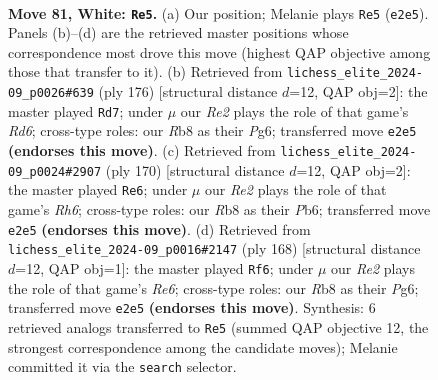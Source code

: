 \documentclass[11pt]{article}
\begin{document}
\clearpage

\begin{figure}[p]\centering
\begin{subfigure}{0.46\textwidth}\centering
\resizebox{\linewidth}{!}{%
\newchessgame
\chessboard[
  setfen={1R6/3k2r1/8/3b4/1P6/2K5/4R3/8 w - - 35 81},
  showmover=false,
  pgfstyle=straightmove, color=movearrow, markmove={e2-e5}
]}
\caption{}
\end{subfigure}\hfill
\begin{subfigure}{0.46\textwidth}\centering
\resizebox{\linewidth}{!}{%
\newchessgame
\chessboard[
  setfen={4r2k/8/3R2PK/8/8/8/8/8 w - - 29 89},
  showmover=false,
  pgfstyle=straightmove, color=movearrow, markmove={d6-d7}
]}
\caption{}
\end{subfigure}
\\[4pt]
\begin{subfigure}{0.46\textwidth}\centering
\resizebox{\linewidth}{!}{%
\newchessgame
\chessboard[
  setfen={k2r4/8/KP5R/8/8/8/8/8 w - - 37 86},
  showmover=false,
  pgfstyle=straightmove, color=movearrow, markmove={h6-e6}
]}
\caption{}
\end{subfigure}\hfill
\begin{subfigure}{0.46\textwidth}\centering
\resizebox{\linewidth}{!}{%
\newchessgame
\chessboard[
  setfen={r6k/8/4R1PK/8/8/8/8/8 w - - 17 85},
  showmover=false,
  pgfstyle=straightmove, color=movearrow, markmove={e6-f6}
]}
\caption{}
\end{subfigure}
\caption{\textbf{Move 81, White: \texttt{Re5}.} (a) Our position; Melanie plays \texttt{Re5} (\texttt{e2e5}). Panels (b)--(d) are the retrieved master positions whose correspondence most drove this move (highest QAP objective among those that transfer to it). (b) Retrieved from \texttt{lichess\_elite\_2024-09\_p0026\#639} (ply 176) [structural distance $d$=12, QAP obj=2]: the master played \texttt{Rd7}; under $\mu$ our \emph{Re2} plays the role of that game's \emph{Rd6}; cross-type roles: our \emph{R}b8 as their \emph{P}g6; transferred move \texttt{e2e5} \textbf{(endorses this move)}. (c) Retrieved from \texttt{lichess\_elite\_2024-09\_p0024\#2907} (ply 170) [structural distance $d$=12, QAP obj=2]: the master played \texttt{Re6}; under $\mu$ our \emph{Re2} plays the role of that game's \emph{Rh6}; cross-type roles: our \emph{R}b8 as their \emph{P}b6; transferred move \texttt{e2e5} \textbf{(endorses this move)}. (d) Retrieved from \texttt{lichess\_elite\_2024-09\_p0016\#2147} (ply 168) [structural distance $d$=12, QAP obj=1]: the master played \texttt{Rf6}; under $\mu$ our \emph{Re2} plays the role of that game's \emph{Re6}; cross-type roles: our \emph{R}b8 as their \emph{P}g6; transferred move \texttt{e2e5} \textbf{(endorses this move)}. Synthesis: 6 retrieved analogs transferred to \texttt{Re5} (summed QAP objective 12, the strongest correspondence among the candidate moves); Melanie committed it via the \texttt{search} selector.}
\label{fig:thought-m160}
\end{figure}
\end{document}

